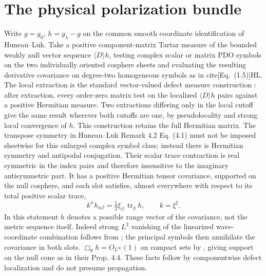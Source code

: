 \documentclass[11pt]{article}
\begin{document}
\section{The physical polarization bundle}
\label{sec:bundle}
Write \(g=g_0\), \(h=g_\lambda-g\) on the common smooth coordinate identification of Huneau--Luk. Take a positive component-matrix Tartar measure of the bounded weakly null vector sequence \(\langle D\rangle h\), testing complex scalar or matrix PDO symbols on the two individually oriented cosphere sheets and evaluating the resulting derivative covariance on degree-two homogeneous symbols as in cite[Eq.~(1.5)]{HL}. The local extraction is the standard vector-valued defect measure construction \cite{Gerard,Tartar}: after extraction, every order-zero matrix test on the localized \(\langle D\rangle h\) pairs against a positive Hermitian measure. Two extractions differing only in the local cutoff give the same result wherever both cutoffs are one, by pseudolocality and strong local convergence of \(h\). This construction retains the full Hermitian matrix. The transpose symmetry in Huneau--Luk Remark 4.2 Eq. (4.1) must not be imposed sheetwise for this enlarged complex symbol class; instead there is Hermitian symmetry and antipodal conjugation. Their scalar trace contraction is real symmetric in the index pairs and therefore insensitive to the imaginary antisymmetric part. It has a positive Hermitian tensor covariance, supported on the null cosphere, and each slot satisfies, almost everywhere with respect to its total positive scalar trace,
\[
 k^\alpha h_{\alpha\beta}=\tfrac12\xi_\beta\,\operatorname{tr}_g h,\qquad
 k=\xi^\sharp.
\]
In this statement \(h\) denotes a possible range vector of the covariance, not the metric sequence itself. Indeed strong \(L^2\) vanishing of the linearized wave-coordinate combination follows from \cite[Eq.~(3.3)]{HL}; the principal symbols then annihilate the covariance in both slots. \(\Box_g h=O_{L^\infty}(1)\) on compact sets by \cite[Eq.~(3.15)]{HL}, giving support on the null cone as in their Prop. 4.4. These facts follow by componentwise defect localization and do not presume propagation.
\end{document}
